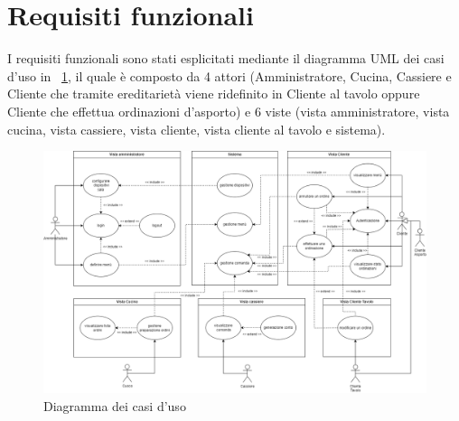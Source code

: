 \section{Requisiti funzionali}
I requisiti funzionali sono stati esplicitati mediante il diagramma UML dei casi d’uso in \figurename~\ref{fig:use_cases_diagram}, il quale è composto da 4 attori (Amministratore, Cucina, Cassiere e Cliente che tramite ereditarietà viene ridefinito in Cliente al tavolo oppure Cliente che effettua ordinazioni d’asporto) e 6 viste (vista amministratore, vista cucina, vista cassiere, vista cliente, vista cliente al tavolo e sistema).

\begin{figure}[htbp]

	\centering
	
	
	\includegraphics[scale=0.32]{iterazione0/images/use_cases_diagram}
	\caption{Diagramma dei casi d'uso\label{fig:use_cases_diagram}}
\end{figure}


